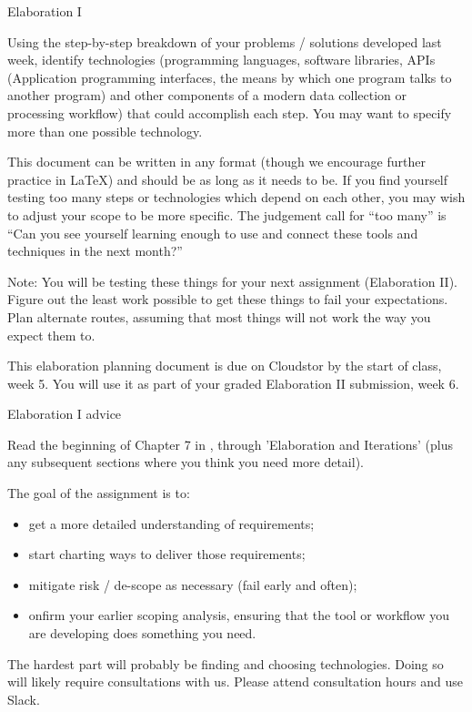 \documentclass[aspectratio=1610, 11pt]{beamer} %
\begin{document}
\begin{frame}{Elaboration I}

{\small 
Using the step-by-step breakdown of your problems / solutions developed last week, identify technologies (programming languages, software libraries, APIs (Application programming interfaces, the means by which one program talks to another program) and other components of a modern data collection or processing workflow) that could accomplish each step. You may want to specify more than one possible technology. 

This document can be written in any format (though we encourage further practice in LaTeX) and should be as long as it needs to be. If you find yourself testing too many steps or technologies which depend on each other, you may wish to adjust your scope to be more specific. The judgement call for “too many” is “Can you see yourself learning enough to use and connect these tools and techniques in the next month?” 

Note: You will be testing these things for your next assignment (Elaboration II). Figure out the least work possible to get these things to fail your expectations. Plan alternate routes, assuming that most things will not work the way you expect them to. 

This elaboration planning document is due on Cloudstor by the start of class, week 5. You will use it as part of your graded Elaboration II submission, week 6.}

    
\end{frame}

\begin{frame}{Elaboration I advice}

Read the beginning of Chapter 7 in , through 'Elaboration and Iterations' (plus any subsequent sections where you think you need more detail).

The goal of the assignment is to:

\begin{itemize}[label=\textbullet]
    \item get a more detailed understanding of requirements;
    \item start charting ways to deliver those requirements;
    \item mitigate risk / de-scope as necessary (fail early and often);
    \item onfirm your earlier scoping analysis, ensuring that the tool or workflow you are developing does something you need.
\end{itemize}

The hardest part will probably be finding and choosing technologies. Doing so will likely require consultations with us. Please attend consultation hours and use Slack.

\end{frame}
\end{document}
